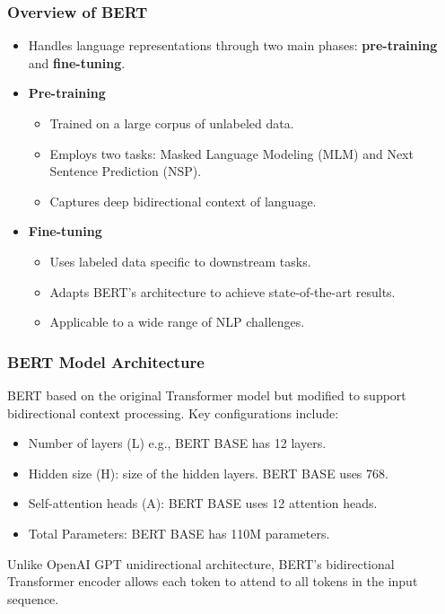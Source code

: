 \documentclass[11pt,xcolor={dvipsnames},hyperref={pdftex,pdfpagemode=UseNone,hidelinks,pdfdisplaydoctitle=true},usepdftitle=false]{beamer}
\begin{document}
\begin{frame}
    \frametitle{Overview of BERT}
    \begin{itemize}
        \item Handles language representations through two main phases: \textbf{pre-training} and \textbf{fine-tuning}.
        \item \textbf{Pre-training}
            \begin{itemize}
                \item Trained on a large corpus of unlabeled data.
                \item Employs two tasks: Masked Language Modeling (MLM) and Next Sentence Prediction (NSP).
                \item Captures deep bidirectional context of language.
            \end{itemize}
        \item \textbf{Fine-tuning}
            \begin{itemize}
                \item Uses labeled data specific to downstream tasks.
                \item Adapts BERT's architecture to achieve state-of-the-art results.
                \item Applicable to a wide range of NLP challenges.
            \end{itemize}
    \end{itemize}
\end{frame}

\begin{frame}
\frametitle{BERT Model Architecture}
BERT based on the original Transformer model but modified to support bidirectional context processing. Key configurations include:
\begin{itemize}
    \item Number of layers (L)  e.g., BERT BASE has 12 layers.
    \item Hidden size (H): size of the hidden layers. BERT BASE uses 768.
    \item Self-attention heads (A): BERT BASE uses 12 attention heads.
    \item Total Parameters: BERT BASE has 110M parameters.
\end{itemize}
Unlike OpenAI GPT unidirectional architecture, BERT's bidirectional Transformer encoder allows each token to attend to all tokens in the input sequence.
\end{frame}
\end{document}
